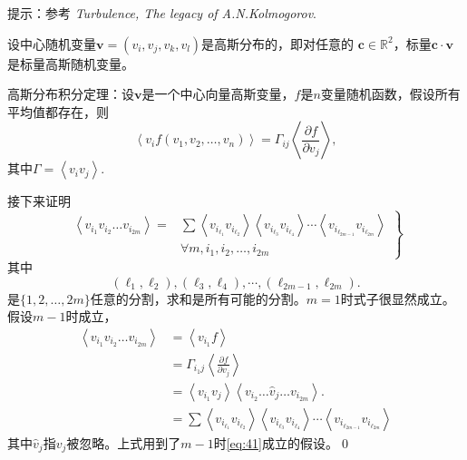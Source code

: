\documentclass[12pt]{ctexart}
\begin{document}
提示：参考 \emph{Turbulence, The legacy of A.N.Kolmogorov}.\cite{Frisch_Turbulence}

设中心随机变量$\bm{v} = (v_i,v_j,v_k,v_l)$是高斯分布的，即对任意的 $\bm{c}\in \mathbb{R}^2$，标量$\bm{c}\cdot \bm{v}$是标量高斯随机变量。

高斯分布积分定理：设$\bm{v}$是一个中心向量高斯变量，$f$是$n$变量随机函数，假设所有平均值都存在，则
\begin{equation}
	\left\langle v_i f(v_1,v_2,\ldots,v_n)\right\rangle = \Gamma_{ij} \left\langle \frac{\partial f}{\partial v_j}\right\rangle,
\end{equation}
其中$\Gamma=\left\langle v_i v_j\right\rangle $.

接下来证明
\begin{equation}
	\left.\begin{array}{rl}
		\left\langle v_{i_{1}} v_{i_{2}} \ldots v_{i_{2 m}}\right\rangle= & \sum\left\langle v_{i_{\ell_{1}}} v_{i_{\ell_{2}}}\right\rangle\left\langle v_{i_{\ell_{3}}} v_{i_{\ell_{4}}}\right\rangle \cdots\left\langle  v_{i_{\ell_{2m-1 }}} v_{i_{\ell_{2 m}}}\right\rangle \\
		                                                                  & \forall m, i_{1}, i_{2}, \ldots, i_{2 m}
	\end{array}\right\}
	\label{eq:41}
\end{equation}
其中
\begin{equation}
	\left(\ell_{1}, \ell_{2}\right),\left(\ell_{3}, \ell_{4}\right), \cdots,\left(\ell_{2 m-1}, \ell_{2 m}\right).
\end{equation}
是$\{1,2, \ldots, 2 {m}\}$任意的分割，求和是所有可能的分割。$m=1$时式子很显然成立。假设$m-1$时成立，
\begin{equation}
	\begin{aligned}
		\left\langle v_{i_{1}} v_{i_{2}} \ldots v_{i_{2 m}}\right\rangle & = \left\langle v_{i_{1}} f \right\rangle         \\
		                                                                 & =
		\Gamma_{i_1 j} \left\langle \frac{\partial f}{\partial v_j}\right\rangle                                            \\
		                                                                 & =
		\left\langle v_{i_{1}} v_{j}\right\rangle\left\langle v_{i_{2}} \ldots \hat{v}_{j} \ldots v_{i_{2 m}}\right\rangle. \\
		                                                                 & =
		\sum\left\langle v_{i_{\ell_{1}}} v_{i_{\ell_{2}}}\right\rangle\left\langle v_{i_{\ell_{3}}} v_{i_{\ell_{4}}}\right\rangle \cdots\left\langle  v_{i_{\ell_{2m-1 }}} v_{i_{\ell_{2 m}}}\right\rangle\end{aligned}
\end{equation}
其中$\hat{v}_j$指$v_j$被忽略。上式用到了$m-1$时\cref{eq:41}成立的假设。\qed
\end{document}
